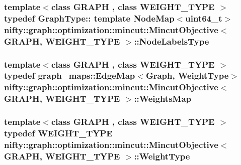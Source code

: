 \subsubsection[{Node\+Labels\+Type}]{\setlength{\rightskip}{0pt plus 5cm}template$<$class G\+R\+A\+P\+H , class W\+E\+I\+G\+H\+T\+\_\+\+T\+Y\+P\+E $>$ typedef Graph\+Type\+:: template Node\+Map$<$uint64\+\_\+t$>$ {\bf nifty\+::graph\+::optimization\+::mincut\+::\+Mincut\+Objective}$<$ G\+R\+A\+P\+H, W\+E\+I\+G\+H\+T\+\_\+\+T\+Y\+P\+E $>$\+::{\bf Node\+Labels\+Type}}\label{classnifty_1_1graph_1_1optimization_1_1mincut_1_1MincutObjective_aae8f1cd3353a96dfe22a0ba35f3f4ac3}
\hypertarget{classnifty_1_1graph_1_1optimization_1_1mincut_1_1MincutObjective_ad4674bd22bb638b7d83a3cf31059e4ed}{}
\subsubsection[{Weights\+Map}]{\setlength{\rightskip}{0pt plus 5cm}template$<$class G\+R\+A\+P\+H , class W\+E\+I\+G\+H\+T\+\_\+\+T\+Y\+P\+E $>$ typedef {\bf graph\+\_\+maps\+::\+Edge\+Map}$<${\bf Graph}, {\bf Weight\+Type}$>$ {\bf nifty\+::graph\+::optimization\+::mincut\+::\+Mincut\+Objective}$<$ G\+R\+A\+P\+H, W\+E\+I\+G\+H\+T\+\_\+\+T\+Y\+P\+E $>$\+::{\bf Weights\+Map}}\label{classnifty_1_1graph_1_1optimization_1_1mincut_1_1MincutObjective_ad4674bd22bb638b7d83a3cf31059e4ed}
\hypertarget{classnifty_1_1graph_1_1optimization_1_1mincut_1_1MincutObjective_acbc5ba581d4e1677cee62a26001786a8}{}
\subsubsection[{Weight\+Type}]{\setlength{\rightskip}{0pt plus 5cm}template$<$class G\+R\+A\+P\+H , class W\+E\+I\+G\+H\+T\+\_\+\+T\+Y\+P\+E $>$ typedef W\+E\+I\+G\+H\+T\+\_\+\+T\+Y\+P\+E {\bf nifty\+::graph\+::optimization\+::mincut\+::\+Mincut\+Objective}$<$ G\+R\+A\+P\+H, W\+E\+I\+G\+H\+T\+\_\+\+T\+Y\+P\+E $>$\+::{\bf Weight\+Type}}\label{classnifty_1_1graph_1_1optimization_1_1mincut_1_1MincutObjective_acbc5ba581d4e1677cee62a26001786a8}


